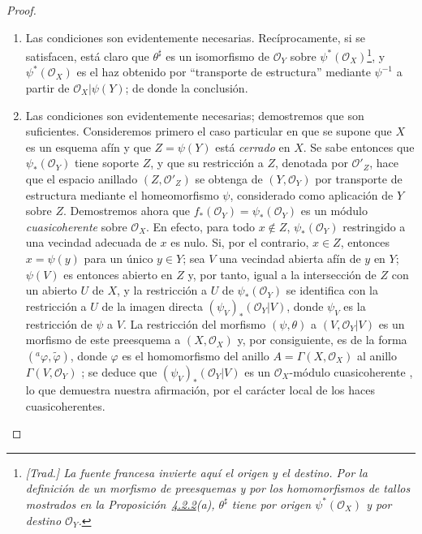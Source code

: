 \documentclass[oneside]{amsart}
\theoremstyle{ega-env-style}
\theoremstyle{ega-thm-env-style}
\theoremstyle{ega-defn-env-style}
\def\mathcal{\mathscr}
\def\sh{\mathcal}                   %
\newcommand{\oldpage}[2][]{{\marginnote{\normalfont{\textbf{#1}~|~#2}}}\ignorespaces}
\begin{document}
\begin{proof}
\medskip\noindent
\begin{enumerate}
  \item[\emph{a)}] Las condiciones son evidentemente necesarias.
    Recíprocamente, si se satisfacen, está claro que $\theta^\sharp$ es un isomorfismo de $\mathscr{O}_Y$ sobre $\psi^*(\mathscr{O}_X)$\footnote{\emph{[Trad.] La fuente francesa invierte aquí el origen y el destino. Por la definición de un morfismo de preesquemas y por los homomorfismos de tallos mostrados en la Proposición~\hyperref[I.4.2.2]{4.2.2}(a), $\theta^\sharp$ tiene por origen $\psi^*(\sh{O}_X)$ y por destino $\sh{O}_Y$.}}, y $\psi^*(\mathscr{O}_X)$ es el haz obtenido por ``transporte de estructura'' mediante $\psi^{-1}$ a partir de $\mathscr{O}_X|\psi(Y)$;
    de donde la conclusión.
  \item[\emph{b)}] Las condiciones son evidentemente necesarias; demostremos que son suficientes.
    Consideremos primero el caso particular en que se supone que $X$ es un esquema afín y que $Z=\psi(Y)$ está \emph{cerrado} en $X$.
    Se sabe entonces  que $\psi_*(\mathscr{O}_Y)$ tiene soporte $Z$, y que su restricción a $Z$, denotada por $\mathscr{O}'_Z$, hace que el espacio anillado $(Z,\mathscr{O}'_Z)$ se obtenga de $(Y,\mathscr{O}_Y)$ por transporte de estructura mediante el homeomorfismo $\psi$, considerado como aplicación de $Y$ sobre $Z$.
    Demostremos ahora que $f_*(\mathscr{O}_Y)=\psi_*(\mathscr{O}_Y)$ es un módulo \emph{cuasicoherente} sobre $\mathscr{O}_X$.
    En efecto, para todo $x\notin Z$, $\psi_*(\mathscr{O}_Y)$ restringido a una vecindad adecuada de $x$ es nulo.
    Si, por el contrario, $x\in Z$, entonces $x=\psi(y)$ para un único $y\in Y$;
    sea $V$ una vecindad abierta afín de $y$ en $Y$;
    $\psi(V)$ es entonces abierto en $Z$ y, por tanto, igual a la intersección de $Z$ con un abierto $U$ de $X$, y la restricción a $U$ de $\psi_*(\mathscr{O}_Y)$ se identifica con la restricción a $U$ de la imagen directa
\oldpage[I]{123}
    $(\psi_V)_*(\mathscr{O}_Y|V)$, donde $\psi_V$ es la restricción de $\psi$ a $V$.
    La restricción del morfismo $(\psi,\theta)$ a $(V,\mathscr{O}_Y|V)$ es un morfismo de este preesquema a $(X,\mathscr{O}_X)$ y, por consiguiente, es de la forma $({}^a\varphi,\widetilde{\varphi})$, donde $\varphi$ es el homomorfismo del anillo $A=\Gamma(X,\mathscr{O}_X)$ al anillo $\Gamma(V,\mathscr{O}_Y)$ ;
    se deduce que $(\psi_V)_*(\mathscr{O}_Y|V)$ es un $\mathscr{O}_X$-módulo cuasicoherente , lo que demuestra nuestra afirmación, por el carácter local de los haces cuasicoherentes.

\end{enumerate}
\end{proof}
\end{document}
